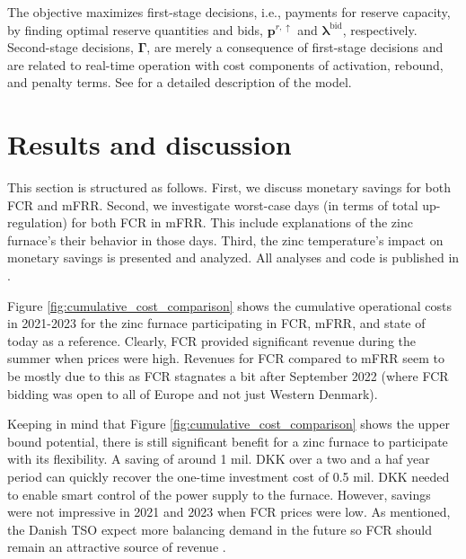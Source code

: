 \documentclass[sigconf]{acmart}
\begin{document}
The objective maximizes first-stage decisions, i.e., payments for reserve capacity, by finding optimal reserve quantities and bids, $\bm{p}^{r,\uparrow}$ and $\bm{\lambda}^{\text{bid}}$, respectively. Second-stage decisions, $\bm{\Gamma}$, are merely a consequence of first-stage decisions and are related to real-time operation with cost components of activation, rebound, and penalty terms. See \cite{gade2023load} for a detailed description of the model.

\section{Results and discussion}

This section is structured as follows. First, we discuss monetary savings for both FCR and mFRR. Second, we investigate worst-case days (in terms of total up-regulation) for both FCR in mFRR. This include explanations of the zinc furnace's their behavior in those days. Third, the zinc temperature's impact on monetary savings is presented and analyzed. All analyses and code is published in \cite{code}.

Figure \ref{fig:cumulative_cost_comparison} shows the cumulative operational costs in 2021-2023 for the zinc furnace participating in FCR, mFRR, and state of today as a reference. Clearly, FCR provided significant revenue during the summer when prices were high. Revenues for FCR compared to mFRR seem to be mostly due to this as FCR stagnates a bit after September 2022 (where FCR bidding was open to all of Europe and not just Western Denmark).

Keeping in mind that Figure \ref{fig:cumulative_cost_comparison} shows the upper bound potential, there is still significant benefit for a zinc furnace to participate with its flexibility. A saving of around 1 mil. DKK over a two and a haf year period can quickly recover the one-time investment cost of 0.5 mil. DKK needed to enable smart control of the power supply to the furnace. However, savings were not impressive in 2021 and 2023 when FCR prices were low. As mentioned, the Danish TSO expect more balancing demand in the future so FCR should remain an attractive source of revenue \cite{energinet:scenario_report_2022}.
\end{document}
